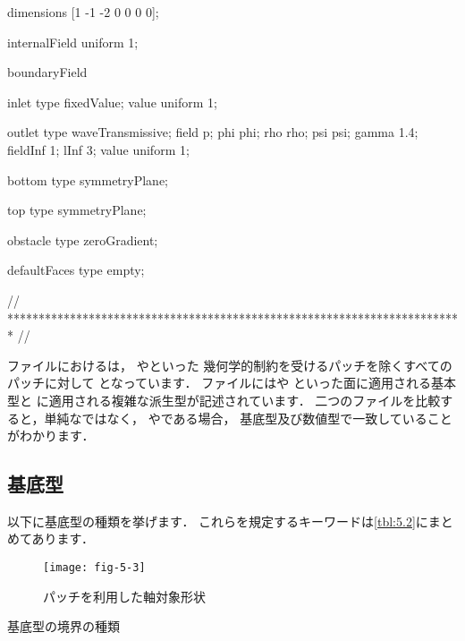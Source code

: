 \begin{OFverbatim}[file, linenum=17]
dimensions      [1 -1 -2 0 0 0 0];

internalField   uniform 1;

boundaryField
{
    inlet
    {
        type            fixedValue;
        value           uniform 1;
    }

    outlet
    {
        type            waveTransmissive;
        field           p;
        phi             phi;
        rho             rho;
        psi             psi;
        gamma           1.4;
        fieldInf        1;
        lInf            3;
        value           uniform 1;
    }

    bottom
    {
        type            symmetryPlane;
    }

    top
    {
        type            symmetryPlane;
    }

    obstacle
    {
        type            zeroGradient;
    }

    defaultFaces
    {
        type            empty;
    }
}

// ************************************************************************* //
\end{OFverbatim}
ファイルにおけるは，
やといった
幾何学的制約を受けるパッチを除くすべてのパッチに対して
となっています．
ファイルにはや
といった面に適用される基本型と
に適用される複雑な派生型が記述されています．
二つのファイルを比較すると，単純なではなく，
やである場合，
基底型及び数値型で一致していることがわかります．


\subsection{ 基底型}
\label{ssec:5.2.2}
以下に基底型の種類を挙げます．
これらを規定するキーワードは\autoref{tbl:5.2}にまとめてあります．


\begin{figure}[ht]
 \texttt{[image: fig-5-3]}
 \caption{パッチを利用した軸対象形状}
 \label{fig:5.3}
\end{figure}


\begin{table}[ht]
 
 \caption{基底型の境界の種類}
 \label{tbl:5.2}
\end{table}


